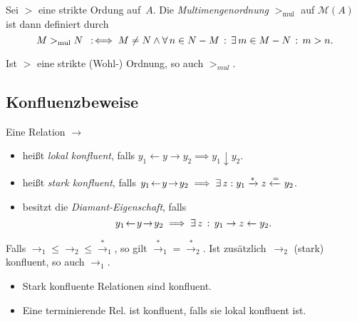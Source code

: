 \documentclass{cheat-sheet}
\newcommand{\from}{\leftarrow}
\newcommand{\reducesTo}{\xrightarrow{*}}
\newcommand{\fromOrEq}{\xleftarrow{=}}
\newcommand{\joinable}{\downarrow}
\newcommand{\Multisets}{\mathcal{M}} %
\begin{document}
\begin{defn}
  Sei ${>}$ eine strikte Ordung auf~$A$.
  Die \emph{Multimengenordnung} $>_{\text{mul}}$ auf $\Multisets(A)$ ist dann definiert durch
  \[
    M >_{\text{mul}} N \enspace:\!\iff M \neq N \wedge \forall \, {n \in N - M} \,:\, \exists \, {m \in M - N} \,:\, m > n.
  \]
\end{defn}

\begin{lem}
  Ist $>$ eine strikte (Wohl-) Ordnung, so auch $>_{\textit{mul}}$.
\end{lem}


\subsection{Konfluenzbeweise}

\begin{defn}
  Eine Relation ${\to}$
  \begin{itemize}
    \item heißt \emph{lokal konfluent}, falls $y_1 \!\from\! y \to y_2 \implies y_1 \joinable y_2$.
    \item heißt \emph{stark konfluent}, falls $y_1 \!\from\! y \!\to\! y_2 \implies \ex{z\!}\! y_1 \reducesTo z \fromOrEq y_2$.
    \item besitzt die \emph{Diamant-Eigenschaft}, falls
    \[
      y_1 \!\from\! y \!\to\! y_2 \implies \ex{z} y_1 \to z \from y_2.
    \]
  \end{itemize}
\end{defn}

\begin{lem}
  Falls ${\to_1} \leq {\to_2} \leq {\xrightarrow{*}_1}$, so gilt ${\xrightarrow{*}_1} = {\xrightarrow{*}_2}$.
  Ist zusätzlich~$\to_2$ (stark) konfluent, so auch ${\to_1}$.
\end{lem}

\begin{lem}
  \begin{itemize}
    \item Stark konfluente Relationen sind konfluent.
    \item Eine terminierende Rel. ist konfluent, falls sie lokal konfluent ist.
  \end{itemize}
\end{lem}

\end{document}
